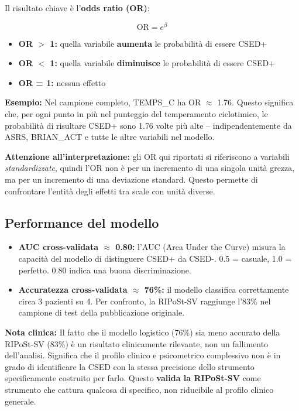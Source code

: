 \documentclass[12pt, a4paper]{article}
\newcommand{\nota}[1]{\vspace{0.4em}\noindent\colorbox{gray!15}{\parbox{\dimexpr\linewidth-2\fboxsep}{\small\textbf{Nota clinica:} #1}}\vspace{0.4em}}
\begin{document}
Il risultato chiave è l'\textbf{odds ratio (OR)}:

\begin{equation*}
\text{OR} = e^{\beta}
\end{equation*}

\begin{itemize}
    \item \textbf{OR $>$ 1:} quella variabile \textbf{aumenta} le probabilità di essere CSED+
    \item \textbf{OR $<$ 1:} quella variabile \textbf{diminuisce} le probabilità di essere CSED+
    \item \textbf{OR = 1:} nessun effetto
\end{itemize}

\textbf{Esempio:} Nel campione completo, TEMPS\_C ha OR $\approx$ 1.76. Questo significa
che, per ogni punto in più nel punteggio del temperamento ciclotimico, le probabilità di
risultare CSED+ sono 1.76 volte più alte -- indipendentemente da ASRS, BRIAN\_ACT e tutte
le altre variabili nel modello.

\textbf{Attenzione all'interpretazione:} gli OR qui riportati si riferiscono a variabili
\textit{standardizzate}, quindi l'OR non è per un incremento di una singola unità grezza,
ma per un incremento di una deviazione standard. Questo permette di confrontare l'entità
degli effetti tra scale con unità diverse.

\subsection{Performance del modello}

\begin{itemize}
    \item \textbf{AUC cross-validata $\approx$ 0.80:} l'AUC (Area Under the Curve) misura la
          capacità del modello di distinguere CSED+ da CSED-. 0.5 = casuale, 1.0 = perfetto.
          0.80 indica una buona discriminazione.
    \item \textbf{Accuratezza cross-validata $\approx$ 76\%:} il modello classifica
          correttamente circa 3 pazienti su 4. Per confronto, la RIPoSt-SV raggiunge l'83\%
          nel campione di test della pubblicazione originale.
\end{itemize}

\nota{Il fatto che il modello logistico (76\%) sia meno accurato della RIPoSt-SV (83\%) è
un risultato clinicamente rilevante, non un fallimento dell'analisi. Significa che il profilo
clinico e psicometrico complessivo non è in grado di identificare la CSED con la stessa
precisione dello strumento specificamente costruito per farlo. Questo \textbf{valida la
RIPoSt-SV} come strumento che cattura qualcosa di specifico, non riducibile al profilo
clinico generale.}
\end{document}
